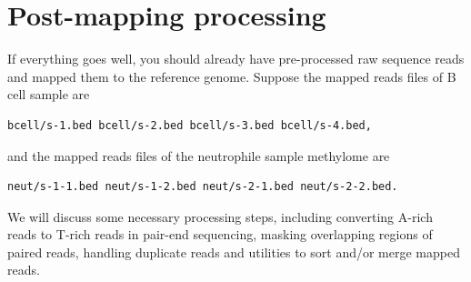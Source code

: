 \documentclass{article}
\begin{document}
\section{Post-mapping processing}
\label{sec:postmapping}







If everything goes well, you should already have pre-processed raw
sequence reads and mapped them to the reference genome. Suppose the
mapped reads files of B cell sample are
\begin{verbatim}
bcell/s-1.bed bcell/s-2.bed bcell/s-3.bed bcell/s-4.bed,
\end{verbatim}
and the mapped reads files of the neutrophile sample methylome are
\begin{verbatim}
neut/s-1-1.bed neut/s-1-2.bed neut/s-2-1.bed neut/s-2-2.bed.
\end{verbatim}
We will discuss some necessary processing steps, including converting
A-rich reads to T-rich reads in pair-end sequencing, masking
overlapping regions of paired reads, handling duplicate reads and
utilities to sort and/or merge mapped reads. 
\end{document}
